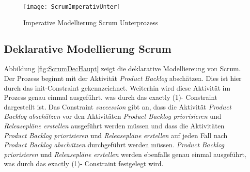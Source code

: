 \begin{figure}[htp]
\begin{center}
  \texttt{[image: ScrumImperativUnter]} %
  \caption{Imperative Modellierung Scrum Unterprozess}
  \label{fig:ScrumImperativUnter}
\end{center}
\end{figure}
\clearpage

\subsection{Deklarative Modellierung Scrum}

Abbildung \ref{fig:ScrumDecHaupt} zeigt die deklarative Modelliereung von Scrum.\newline
Der Prozess beginnt mit der Aktivität \textit{Product Backlog} abschätzen. Dies ist hier durch das init-Constraint gekennzeichnet. Weiterhin wird diese Aktivität im Prozess genau einmal ausgeführt, was durch das exactly (1)- Constraint dargestellt ist. Das Constraint \textit{succession} gibt an, dass die Aktivität \textit{Product Backlog abschätzen} vor den Aktivitäten \textit{Product Backlog priorisieren} und \textit{Releasepläne erstellen} ausgeführt werden müssen und dass die Aktivitäten \textit{Product Backlog priorisieren} und \textit{Releasepläne erstellen} auf jeden Fall nach \textit{Product Backlog abschätzen} durchgeführt werden müssen. \textit{Product Backlog priorisieren} und \textit{Releasepläne erstellen} werden ebenfalls genau einmal ausgeführt, was durch das exactly (1)- Constraint festgelegt wird.  \newline

